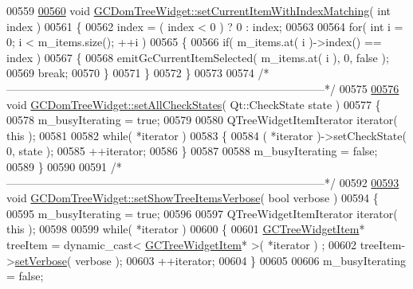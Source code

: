\begin{DoxyCode}
00559 
\hypertarget{gcdomtreewidget_8cpp_source_l00560}{}\hyperlink{class_g_c_dom_tree_widget_ab9178aca10757ba7b7cef489171fb725}{00560} \textcolor{keywordtype}{void} \hyperlink{class_g_c_dom_tree_widget_ab9178aca10757ba7b7cef489171fb725}{GCDomTreeWidget::setCurrentItemWithIndexMatching}( \textcolor{keywordtype}{int} index )
00561 \{
00562   index = ( index < 0 ) ? 0 : index;
00563 
00564   \textcolor{keywordflow}{for}( \textcolor{keywordtype}{int} i = 0; i < m\_items.size(); ++i )
00565   \{
00566     \textcolor{keywordflow}{if}( m\_items.at( i )->index() == index )
00567     \{
00568       emitGcCurrentItemSelected( m\_items.at( i ), 0, false );
00569       \textcolor{keywordflow}{break};
00570     \}
00571   \}
00572 \}
00573 
00574 \textcolor{comment}{/*
      --------------------------------------------------------------------------------------*/}
00575 
\hypertarget{gcdomtreewidget_8cpp_source_l00576}{}\hyperlink{class_g_c_dom_tree_widget_ae61a0ae85b5d250c49ebc8cfc6c24d09}{00576} \textcolor{keywordtype}{void} \hyperlink{class_g_c_dom_tree_widget_ae61a0ae85b5d250c49ebc8cfc6c24d09}{GCDomTreeWidget::setAllCheckStates}( Qt::CheckState state )
00577 \{
00578   m\_busyIterating = \textcolor{keyword}{true};
00579 
00580   QTreeWidgetItemIterator iterator( \textcolor{keyword}{this} );
00581 
00582   \textcolor{keywordflow}{while}( *iterator )
00583   \{
00584     ( *iterator )->setCheckState( 0, state );
00585     ++iterator;
00586   \}
00587 
00588   m\_busyIterating = \textcolor{keyword}{false};
00589 \}
00590 
00591 \textcolor{comment}{/*
      --------------------------------------------------------------------------------------*/}
00592 
\hypertarget{gcdomtreewidget_8cpp_source_l00593}{}\hyperlink{class_g_c_dom_tree_widget_a821fc62f1e29b67b3f6b00cd50de3bc8}{00593} \textcolor{keywordtype}{void} \hyperlink{class_g_c_dom_tree_widget_a821fc62f1e29b67b3f6b00cd50de3bc8}{GCDomTreeWidget::setShowTreeItemsVerbose}( \textcolor{keywordtype}{bool} verbose )
00594 \{
00595   m\_busyIterating = \textcolor{keyword}{true};
00596 
00597   QTreeWidgetItemIterator iterator( \textcolor{keyword}{this} );
00598 
00599   \textcolor{keywordflow}{while}( *iterator )
00600   \{
00601     \hyperlink{class_g_c_tree_widget_item}{GCTreeWidgetItem}* treeItem = \textcolor{keyword}{dynamic\_cast<} \hyperlink{class_g_c_tree_widget_item}{GCTreeWidgetItem}* \textcolor{keyword}{>}( *iterator )
      ;
00602     treeItem->\hyperlink{class_g_c_tree_widget_item_a557b0034fd98a444a7173d76a6320f4c}{setVerbose}( verbose );
00603     ++iterator;
00604   \}
00605 
00606   m\_busyIterating = \textcolor{keyword}{false};

\end{DoxyCode}
